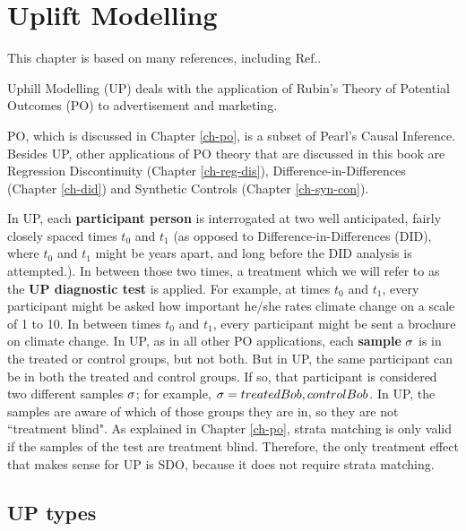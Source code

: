 \chapter{Uplift Modelling}
\label{ch-uplift}



This chapter is based 
on 
many references,
including Ref.\cite{uplift-2017, fei, wiki-uplift,jaros}.

Uphill Modelling (UP)
deals
with  the application of
Rubin's Theory of
Potential Outcomes (PO)
to advertisement and marketing.

PO, which is
discussed in Chapter \ref{ch-po},
 is a subset
of Pearl's Causal Inference.
Besides UP, other  applications of PO theory
that are discussed in this book 
are Regression Discontinuity (Chapter \ref{ch-reg-dis}),
Difference-in-Differences (Chapter \ref{ch-did})
and Synthetic Controls (Chapter \ref{ch-syn-con}).

In UP,
each {\bf participant person}
is interrogated at two well
anticipated, fairly closely spaced times
$t_0$ and $t_1$ (as opposed to 
Difference-in-Differences  (DID), where
$t_0$ and $t_1$ might
be years apart, and
long before the DID analysis is 
attempted.).
In between those two times,
a treatment which
we will refer to as the
{\bf UP diagnostic test} is applied.
For example,
at times $t_0$ and $t_1$,
every participant
might be asked
how important he/she rates climate 
change on a scale of 1 to 10.
In between times
$t_0$ and $t_1$,
every participant might
be sent a brochure on climate change.
In UP, as in all 
other PO applications, 
each {\bf sample}
$\sigma$
is in the 
treated or control
groups, but not both.
But in UP,
the same participant can be
in both the 
treated and control groups.
If so, that participant
is considered two different samples $\sigma$;
for example, $\sigma=treated Bob, control Bob$.
In UP,
the samples
are aware  of which
of those groups they are in,
so they are not ``treatment blind".
As explained in 
Chapter \ref{ch-po},
strata matching is only valid
if the samples
of the test are treatment blind.
Therefore, the only
treatment effect that 
makes sense for UP is SDO,
because it
 does not require strata matching.

\section{UP types}

